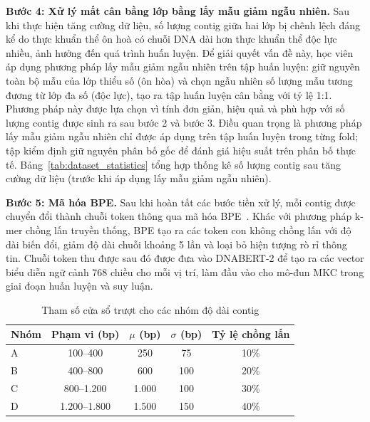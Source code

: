 \textbf{Bước 4: Xử lý mất cân bằng lớp bằng lấy mẫu giảm ngẫu nhiên.} Sau khi thực hiện tăng cường dữ liệu, số lượng contig giữa hai lớp bị chênh lệch đáng kể do thực khuẩn thể ôn hoà có chuỗi DNA dài hơn thực khuẩn thể độc lực nhiều, ảnh hưởng đến quá trình huấn luyện. Để giải quyết vấn đề này, học viên áp dụng phương pháp lấy mẫu giảm ngẫu nhiên trên tập huấn luyện: giữ nguyên toàn bộ mẫu của lớp thiểu số (ôn hòa) và chọn ngẫu nhiên số lượng mẫu tương đương từ lớp đa số (độc lực), tạo ra tập huấn luyện cân bằng với tỷ lệ 1:1. Phương pháp này được lựa chọn vì tính đơn giản, hiệu quả và phù hợp với số lượng contig được sinh ra sau bước 2 và bước 3. Điều quan trọng là phương pháp lấy mẫu giảm ngẫu nhiên chỉ được áp dụng trên tập huấn luyện trong từng fold; tập kiểm định giữ nguyên phân bố gốc để đánh giá hiệu suất trên phân bố thực tế. Bảng~\ref{tab:dataset_statistics} tổng hợp thống kê số lượng contig sau tăng cường dữ liệu (trước khi áp dụng lấy mẫu giảm ngẫu nhiên).

\textbf{Bước 5: Mã hóa BPE.} Sau khi hoàn tất các bước tiền xử lý, mỗi contig được chuyển đổi thành chuỗi token thông qua mã hóa BPE~\cite{sennrich2015neural}. Khác với phương pháp k-mer chồng lấn truyền thống, BPE tạo ra các token con không chồng lấn với độ dài biến đổi, giảm độ dài chuỗi khoảng 5 lần và loại bỏ hiện tượng rò rỉ thông tin. Chuỗi token thu được sau đó được đưa vào DNABERT-2 để tạo ra các vector biểu diễn ngữ cảnh 768 chiều cho mỗi vị trí, làm đầu vào cho mô-đun MKC trong giai đoạn huấn luyện và suy luận.

\begin{table}[h]
    \centering
    \caption{Tham số cửa sổ trượt cho các nhóm độ dài contig}
    \label{tab:sliding_window_params}
    \begin{tabular}{lcccc}
        \toprule
        \textbf{Nhóm} & \textbf{Phạm vi (bp)} & \textbf{$\mu$ (bp)} & \textbf{$\sigma$ (bp)} & \textbf{Tỷ lệ chồng lấn} \\
        \midrule
        A             & 100--400              & 250                 & 75                     & 10\%                   \\
        B             & 400--800              & 600                 & 100                    & 20\%                   \\
        C             & 800--1.200            & 1.000               & 100                    & 30\%                   \\
        D             & 1.200--1.800          & 1.500               & 150                    & 40\%                   \\
        \bottomrule
    \end{tabular}
\end{table}

